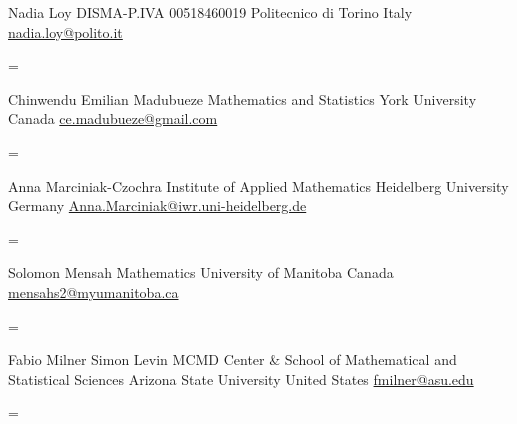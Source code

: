 \documentclass[
  letterpaper,
  DIV=11,
  numbers=noendperiod]{scrartcl}
\newenvironment{absolutelynopagebreak}
  {\par\nobreak\vfil\penalty0\vfilneg
   \vtop\bgroup}
  {\par\xdef\tpd{\the\prevdepth}\egroup
   \prevdepth=\tpd}
\begin{document}
\begin{absolutelynopagebreak}Nadia   Loy \newline
\mbox{}\quad  DISMA-P.IVA 00518460019 \newline
\mbox{}\quad  Politecnico di Torino \newline
\mbox{}\quad  Italy \newline
\mbox{}\quad \href{mailto: nadia.loy@polito.it }{ nadia.loy@polito.it }
\end{absolutelynopagebreak}\vskip0.2cm
\begin{absolutelynopagebreak}Chinwendu Emilian   Madubueze \newline
\mbox{}\quad  Mathematics and Statistics \newline
\mbox{}\quad  York University \newline
\mbox{}\quad  Canada \newline
\mbox{}\quad \href{mailto: ce.madubueze@gmail.com }{ ce.madubueze@gmail.com }
\end{absolutelynopagebreak}\vskip0.2cm
\begin{absolutelynopagebreak}Anna   Marciniak-Czochra \newline
\mbox{}\quad  Institute of Applied Mathematics \newline
\mbox{}\quad  Heidelberg University \newline
\mbox{}\quad  Germany \newline
\mbox{}\quad \href{mailto: Anna.Marciniak@iwr.uni-heidelberg.de }{ Anna.Marciniak@iwr.uni-heidelberg.de }
\end{absolutelynopagebreak}\vskip0.2cm
\begin{absolutelynopagebreak}Solomon   Mensah \newline
\mbox{}\quad  Mathematics \newline
\mbox{}\quad  University of Manitoba  \newline
\mbox{}\quad  Canada \newline
\mbox{}\quad \href{mailto: mensahs2@myumanitoba.ca }{ mensahs2@myumanitoba.ca }
\end{absolutelynopagebreak}\vskip0.2cm
\begin{absolutelynopagebreak}Fabio   Milner \newline
\mbox{}\quad  Simon Levin MCMD Center \& School of Mathematical and Statistical Sciences \newline
\mbox{}\quad  Arizona State University \newline
\mbox{}\quad  United States \newline
\mbox{}\quad \href{mailto: fmilner@asu.edu }{ fmilner@asu.edu }
\end{absolutelynopagebreak}\vskip0.2cm
\end{document}
